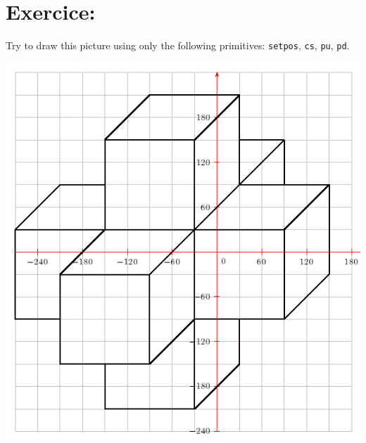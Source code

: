 \section{Exercice:}
\noindent
Try to draw this picture using only the following primitives: \texttt{setpos}, \texttt{cs}, \texttt{pu}, \texttt{pd}.\\
\begin{center}
\includegraphics[scale=0.7]{pics/fpos-cube.png}
\end{center}